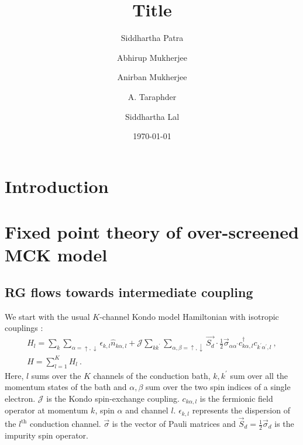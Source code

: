 \documentclass[reprint,prb,superscriptaddress]{revtex4-2}
\begin{document}
\title{Title}
\author{Siddhartha Patra}
\author{Abhirup Mukherjee}
\author{Anirban Mukherjee}
\author{A. Taraphder}
\author{Siddhartha Lal}
\date{\today}
\begin{abstract}
	\lipsum[1-2]
\end{abstract}
\maketitle


\section{Introduction}
\lipsum[1-9]

\section{Fixed point theory of over-screened MCK model}

\subsection{RG flows towards intermediate coupling}
\label{rg_flow_section}
We start with the usual \(K\)-channel Kondo model Hamiltonian with isotropic couplings \cite{Noz_blandin_1980}:
\begin{gather}
	\label{mc_ham}
	H_l = \sum_{k}\sum_{\alpha=\uparrow,\downarrow}\epsilon_{k,l} \hat n_{k\alpha,l} + \mathcal{J}\sum_{kk^\prime} \sum_{\alpha,\beta= \uparrow,\downarrow}\vec{S_d}\cdot\frac{1}{2}\vec{\sigma}_{\alpha\alpha^\prime}c_{k\alpha,l}^\dagger c_{k^\prime\alpha^\prime, l}~,\nonumber\\
	H = \sum_{l=1}^K H_l~.
\end{gather}
Here, \(l\) sums over the \(K\) channels of the conduction bath, \(k,k^\prime\) sum over all the momentum states of the bath and \(\alpha,\beta\) sum over the two spin indices of a single electron. \(\mathcal{J}\) is the Kondo spin-exchange coupling. \(c_{k\alpha,l}\) is the fermionic field operator at momentum \(k\), spin \(\alpha\) and channel \(l\). \(\epsilon_{k,l}\) represents the dispersion of the \(l^\text{th}\) conduction channel. \(\vec \sigma\) is the vector of Pauli matrices and \(\vec S_d = \frac{1}{2}\vec \sigma_d\) is the impurity spin operator.
\end{document}
